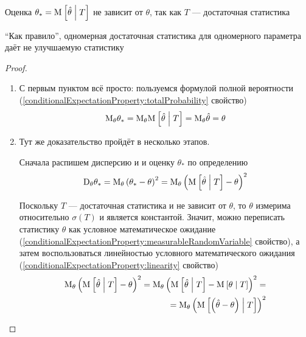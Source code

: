 \begin{remark}
    Оценка $\theta_* = \mathrm{M}_{} \left[ \hat{\theta} \;\middle|\; T \right]$ не зависит от $\theta$,
    так как $T$ --- достаточная статистика
\end{remark}

\begin{remark}
    ``Как правило'', одномерная достаточная статистика
    для одномерного параметра даёт не улучшаемую статистику
\end{remark}

\begin{proof}
    \begin{enumerate}
        \item С первым пунктом всё просто:
            пользуемся формулой полной вероятности
            (\ref{conditionalExpectationProperty:totalProbability} свойство)
            $$\mathrm{M}_{\theta} \theta_*
                = \mathrm{M}_{\theta} \mathrm{M}_{} \left[ \hat{\theta} \;\middle|\; T \right]
                = \mathrm{M}_{\theta} \hat{\theta}
                = \theta$$
        \item Тут же доказательство пройдёт в несколько этапов.

            Сначала распишем дисперсию и и оценку $\theta_*$ по определению
            $$\mathrm{D}_{\theta} \theta_*
                = \mathrm{M}_{\theta} \left( \theta_* - \theta \right)^2
                = \mathrm{M}_{\theta} \left( \mathrm{M}_{} \left[ \hat{\theta} \;\middle|\; T \right]
                    - \theta \right)^2$$

            Поскольку $T$ --- достаточная статистика и не зависит от $\theta$,
            то $\theta$ измерима относительно $\sigma\left( T \right)$
            и является константой. Значит, можно переписать
            статистику $\theta$ как условное математическое ожидание
            (\ref{conditionalExpectationProperty:measurableRandomVariable}
            свойство), а затем воспользоваться линейностью
            условного математического ожидания
            (\ref{conditionalExpectationProperty:linearity} свойство)
            \begin{align*}
                \mathrm{M}_{\theta} \left( \mathrm{M}_{} \left[ \hat{\theta} \;\middle|\; T \right]
                        - \theta \right)^2
                    = \mathrm{M}_{\theta} \left( \mathrm{M}_{} \left[ \hat{\theta} \;\middle|\; T \right]
                        - \mathrm{M}_{} \left[ \theta \;\middle|\; T \right] \right)^2 = \\
                    = \mathrm{M}_{\theta} \left(
                        \mathrm{M}_{} \left[ \left( \hat{\theta} - \theta \right) \;\middle|\; T \right]
                        \right)^2
            \end{align*}


\end{enumerate}
\end{proof}

